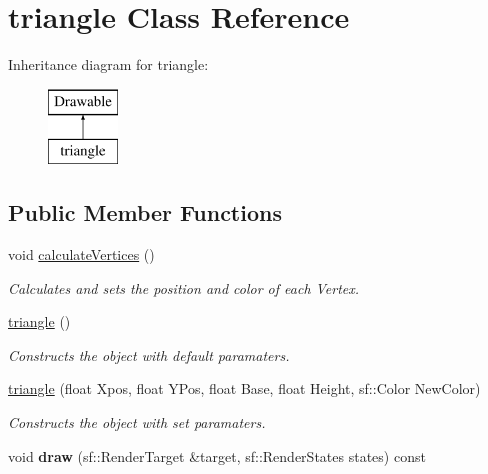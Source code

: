 \hypertarget{classtriangle}{}\section{triangle Class Reference}
\label{classtriangle}
Inheritance diagram for triangle\+:\begin{figure}[H]
\begin{center}
\leavevmode
\includegraphics[height=2.000000cm]{classtriangle}
\end{center}
\end{figure}
\subsection*{Public Member Functions}
\begin{DoxyCompactItemize}
\item 
\mbox{\label{classtriangle_a9a589314e2633a305644f5ac3a317d56}} 
void \mbox{\hyperlink{classtriangle_a9a589314e2633a305644f5ac3a317d56}{calculate\+Vertices}} ()
\begin{DoxyCompactList}\small\item\em Calculates and sets the position and color of each Vertex. \end{DoxyCompactList}\item 
\mbox{\label{classtriangle_ac176bae9dc8cd99ca393c9f360760387}} 
\mbox{\hyperlink{classtriangle_ac176bae9dc8cd99ca393c9f360760387}{triangle}} ()
\begin{DoxyCompactList}\small\item\em Constructs the object with default paramaters. \end{DoxyCompactList}\item 
\mbox{\hyperlink{classtriangle_aa856188746c2435f53441025d4181c51}{triangle}} (float Xpos, float Y\+Pos, float Base, float Height, sf\+::\+Color New\+Color)
\begin{DoxyCompactList}\small\item\em Constructs the object with set paramaters. \end{DoxyCompactList}\item 
\mbox{\label{classtriangle_a9c2634977859ba059a89bce5323e8037}} 
void {\bfseries draw} (sf\+::\+Render\+Target \&target, sf\+::\+Render\+States states) const
\end{DoxyCompactItemize}


